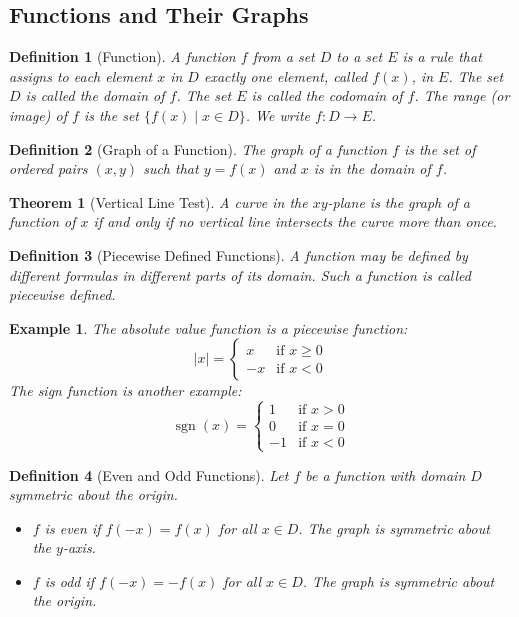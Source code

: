 \documentclass[11pt,a4paper]{article}
\newtheorem{example}{Example}
\newtheorem{theorem}{Theorem}
\newtheorem{definition}{Definition}
\begin{document}
\subsection{Functions and Their Graphs}
\begin{definition}[Function]
A \textit{function} $f$ from a set $D$ to a set $E$ is a rule that assigns to each element $x$ in $D$ exactly one element, called $f(x)$, in $E$. The set $D$ is called the \textit{domain} of $f$. The set $E$ is called the \textit{codomain} of $f$. The \textit{range} (or image) of $f$ is the set $\{f(x) \mid x \in D\}$. We write $f: D \to E$.
\end{definition}
\begin{definition}[Graph of a Function]
The \textit{graph} of a function $f$ is the set of ordered pairs $(x, y)$ such that $y = f(x)$ and $x$ is in the domain of $f$.
\end{definition}
\begin{theorem}[Vertical Line Test]
A curve in the $xy$-plane is the graph of a function of $x$ if and only if no vertical line intersects the curve more than once.
\end{theorem}
\begin{definition}[Piecewise Defined Functions]
A function may be defined by different formulas in different parts of its domain. Such a function is called \textit{piecewise defined}.
\end{definition}
\begin{example}
The absolute value function is a piecewise function:
\[
|x| = \begin{cases} x & \text{if } x \geq 0 \\ -x & \text{if } x < 0 \end{cases}
\]
The sign function is another example:
\[
\operatorname{sgn}(x) = \begin{cases} 1 & \text{if } x > 0 \\ 0 & \text{if } x = 0 \\ -1 & \text{if } x < 0 \end{cases}
\]
\end{example}
\begin{definition}[Even and Odd Functions]
Let $f$ be a function with domain $D$ symmetric about the origin.
\begin{itemize}
\item $f$ is \textit{even} if $f(-x) = f(x)$ for all $x \in D$. The graph is symmetric about the $y$-axis.
\item $f$ is \textit{odd} if $f(-x) = -f(x)$ for all $x \in D$. The graph is symmetric about the origin.
\end{itemize}
\end{definition}
\end{document}
